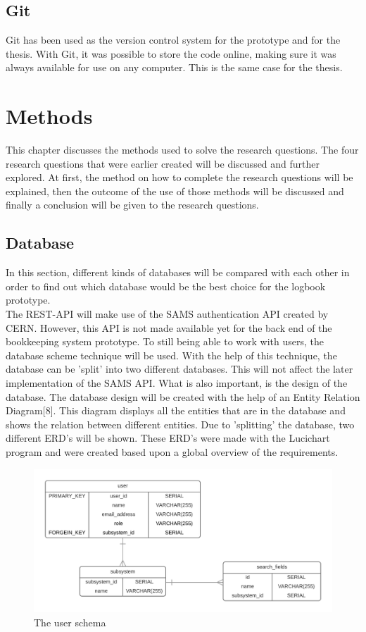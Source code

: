 \documentclass[paper=a4, fontsize=11pt,twoside]{scrartcl}	%
\begin{document}
\subsection{Git}
Git has been used as the version control system for the prototype and for the thesis. With Git, it was possible to store the code online, making sure it was always available for use on any computer. This is the same case for the thesis.

\newpage


\section{Methods}
This chapter discusses the methods used to solve the research questions. The four research questions that were earlier created will be discussed and further explored. At first, the method on how to complete the research questions will be explained, then the outcome of the use of those methods will be discussed and finally a conclusion will be given to the research questions. 

\newpage
\subsection{Database}
In this section, different kinds of databases will be compared with each other in order to find out which database would be the best choice for the logbook prototype. \\
The REST-API will make use of the SAMS authentication API created by CERN. However, this API is not made available yet for the back end of the bookkeeping system prototype. To still being able to work with users, the database scheme technique will be used. With the help of this technique, the database can be 'split' into two different databases. This will not affect the later implementation of the SAMS API.
What is also important, is the design of the database. The database design will be created with the help of an Entity Relation Diagram[8]. This diagram displays all the entities that are in the database and shows the relation between different entities. Due to 'splitting' the database, two different ERD's will be shown. These ERD's were made with the Lucichart program and were created based upon a global overview of the requirements. \\
\begin{figure}[h!]
\includegraphics[scale=0.9]{ERDUser}
\caption{The user schema}
\end{figure}
\end{document}
